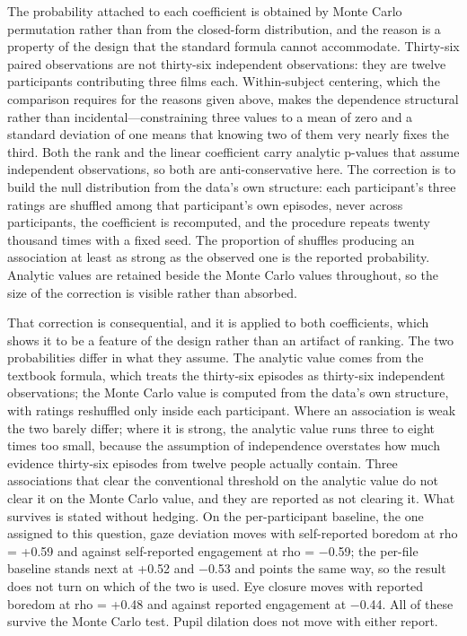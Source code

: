 The probability attached to each coefficient is obtained by Monte Carlo permutation rather than from the
closed-form distribution, and the reason is a property of the design that the standard formula
cannot accommodate. Thirty-six paired observations are not thirty-six independent
observations: they are twelve participants contributing three films each. Within-subject
centering, which the comparison requires for the reasons given above, makes the dependence
structural rather than incidental---constraining three values to a mean of zero and a standard
deviation of one means that knowing two of them very nearly fixes the third. Both the rank and
the linear coefficient carry analytic p-values that assume independent observations, so both
are anti-conservative here. The correction is to build the null distribution from the data's
own structure: each participant's three ratings are shuffled among that participant's own
episodes, never across participants, the coefficient is recomputed, and the procedure repeats
twenty thousand times with a fixed seed. The proportion of shuffles producing an association
at least as strong as the observed one is the reported probability. Analytic values are
retained beside the Monte Carlo values throughout, so the size of the correction is visible
rather than absorbed.

That correction is consequential, and it is applied to both coefficients, which shows it to be
a feature of the design rather than an artifact of ranking. The two probabilities differ in
what they assume. The analytic value comes from the textbook formula, which treats the
thirty-six episodes as thirty-six independent observations; the Monte Carlo value is computed
from the data's own structure, with ratings reshuffled only inside each participant. Where an
association is weak the two barely differ; where it is strong, the analytic value runs three
to eight times too small, because the assumption of independence overstates how much evidence
thirty-six episodes from twelve people actually contain.
Three associations that clear the conventional threshold on the analytic value do not clear it
on the Monte Carlo value, and they are reported as not clearing it. What survives is stated
without hedging. On the per-participant baseline, the one assigned to this question, gaze
deviation moves with self-reported boredom at rho = +0.59 and against self-reported engagement
at rho = $-$0.59; the per-file baseline stands next at +0.52 and $-$0.53 and points the same
way, so the result does not turn on which of the two is used. Eye closure moves with reported
boredom at rho = +0.48 and against reported engagement at $-$0.44. All of these survive the
Monte Carlo test. Pupil dilation does not move with either report.

